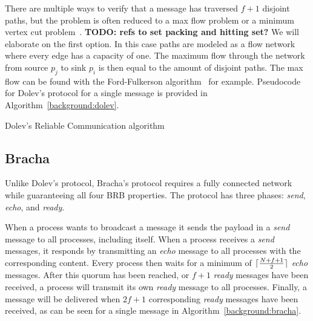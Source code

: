 There are multiple ways to verify that a message has traversed $f+1$ disjoint paths, but the problem is often reduced to a max flow problem or a minimum vertex cut problem~\cite{bonomi2019multihop}. \textbf{TODO: refs to set packing and hitting set?} We will elaborate on the first option. In this case paths are modeled as a flow network where every edge has a capacity of one. The maximum flow through the network from source $p_j$ to sink $p_i$ is then equal to the amount of disjoint paths. The max flow can be found with the Ford-Fulkerson algorithm~\cite{ford_fulkerson} for example. 
Pseudocode for Dolev's protocol for a single message is provided in Algorithm~\ref{background:dolev}.

\begin{algorithm}
  \DontPrintSemicolon
  
  
 \caption{Dolev's Reliable Communication algorithm}
 \label{background:dolev}
\end{algorithm}

\subsection*{Bracha}
Unlike Dolev's protocol, Bracha's protocol requires a fully connected network while guaranteeing all four BRB properties. 
The protocol has three phases: \textit{send}, \textit{echo}, and \textit{ready}.

When a process wants to broadcast a message it sends the payload in a \textit{send} message to all processes, including itself. When a process receives a \textit{send} messages, it responds by transmitting an \textit{echo} message to all processes with the corresponding content. Every process then waits for a minimum of $\lceil\frac{N+f+1}{2}\rceil$ \textit{echo} messages. 
After this quorum has been reached, or $f+1$ \textit{ready} messages have been received, a process will transmit its own \textit{ready} message to all processes. Finally, a message will be delivered when $2f+1$ corresponding \textit{ready} messages have been received, as can be seen for a single message in Algorithm~\ref{background:bracha}.

